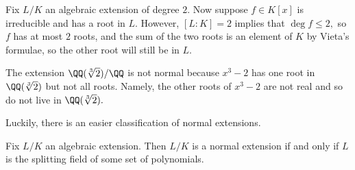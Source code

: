 \documentclass[../notes.tex]{subfiles}
\begin{document}
\begin{example}
	Fix $L/K$ an algebraic extension of degree $2.$ Now suppose $f\in K[x]$ is irreducible and has a root in $L.$ However, $[L:K]=2$ implies that $\deg f\le2,$ so $f$ has at most $2$ roots, and the sum of the two roots is an element of $K$ by Vieta's formulae, so the other root will still be in $L.$
\end{example}
\begin{nex}
	The extension $\QQ(\sqrt[3]2)/\QQ$ is not normal because $x^3-2$ has one root in $\QQ(\sqrt[3]2)$ but not all roots. Namely, the other roots of $x^3-2$ are not real and so do not live in $\QQ(\sqrt[3]2).$
\end{nex}
Luckily, there is an easier classification of normal extensions.
\begin{proposition} \label{prop:normalissplitting}
	Fix $L/K$ an algebraic extension. Then $L/K$ is a normal extension if and only if $L$ is the splitting field of some set of polynomials.
\end{proposition}
\end{document}

